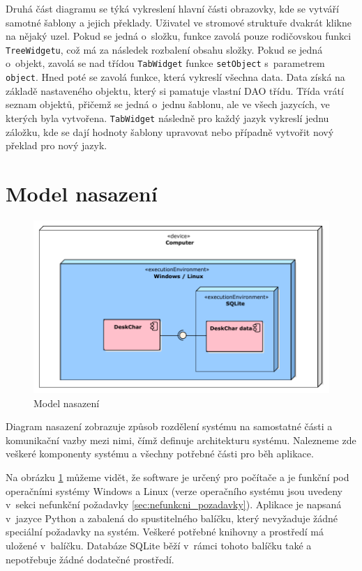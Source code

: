 \documentclass[thesis=B,czech]{resources/FITthesis}[2012/06/26]
\begin{document}
Druhá část diagramu se týká vykreslení hlavní části obrazovky, kde se vytváří samotné šablony a jejich překlady. Uživatel ve stromové struktuře dvakrát klikne na nějaký uzel. Pokud se jedná o~složku, funkce zavolá pouze rodičovskou funkci \texttt{TreeWidgetu}, což má za následek rozbalení obsahu složky. Pokud se jedná o~objekt, zavolá se nad třídou \texttt{TabWidget} funkce \texttt{setObject} s~parametrem \texttt{object}. Hned poté se zavolá funkce, která vykreslí všechna data. Data získá na základě nastaveného objektu, který si pamatuje vlastní DAO třídu. Třída vrátí seznam objektů, přičemž se jedná o~jednu šablonu, ale ve všech jazycích, ve kterých byla vytvořena. \texttt{TabWidget} následně pro každý jazyk vykreslí jednu záložku, kde se dají hodnoty šablony upravovat nebo případně vytvořit nový překlad pro nový jazyk.
	
	\section{Model nasazení}
	\begin{figure}\centering
	\includegraphics[width=1\textwidth]{images/model_nasazeni}
	\caption[Model nasazení]{Model nasazení}\label{fig:model_nasazeni}
	\end{figure}
Diagram nasazení zobrazuje způsob rozdělení systému na samostatné části a komunikační vazby mezi nimi, čímž definuje architekturu systému. Nalezneme zde veškeré komponenty systému a všechny potřebné části pro běh aplikace.\par

Na obrázku \ref{fig:model_nasazeni} můžeme vidět, že software je určený pro počítače a je funkční pod operačními systémy Windows a Linux (verze operačního systému jsou uvedeny v~sekci nefunkční požadavky \ref{sec:nefunkcni_pozadavky}). Aplikace je napsaná v~jazyce Python a zabalená do spustitelného balíčku, který nevyžaduje žádné speciální požadavky na systém. Veškeré potřebné knihovny a prostředí má uložené v~balíčku. Databáze SQLite běží v~rámci tohoto balíčku také a nepotřebuje žádné dodatečné prostředí.
\end{document}
